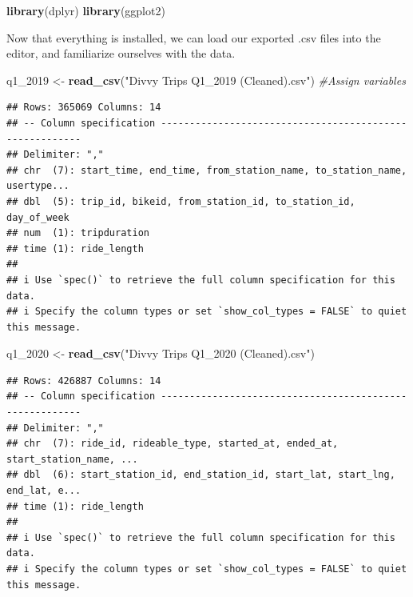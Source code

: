 \documentclass[
]{article}
\newenvironment{Shaded}{\begin{snugshade}}{\end{snugshade}}
\newcommand{\CommentTok}[1]{\textcolor[rgb]{0.56,0.35,0.01}{\textit{#1}}}
\newcommand{\FunctionTok}[1]{\textcolor[rgb]{0.13,0.29,0.53}{\textbf{#1}}}
\newcommand{\NormalTok}[1]{#1}
\newcommand{\OtherTok}[1]{\textcolor[rgb]{0.56,0.35,0.01}{#1}}
\newcommand{\StringTok}[1]{\textcolor[rgb]{0.31,0.60,0.02}{#1}}
\begin{document}
\begin{Shaded}
\begin{Highlighting}[]
\FunctionTok{library}\NormalTok{(dplyr)}
\FunctionTok{library}\NormalTok{(ggplot2)}
\end{Highlighting}
\end{Shaded}

Now that everything is installed, we can load our exported .csv files
into the editor, and familiarize ourselves with the data.

\begin{Shaded}
\begin{Highlighting}[]
\NormalTok{q1\_2019 }\OtherTok{\textless{}{-}} \FunctionTok{read\_csv}\NormalTok{(}\StringTok{"Divvy Trips Q1\_2019 (Cleaned).csv"}\NormalTok{) }\CommentTok{\#Assign variables}
\end{Highlighting}
\end{Shaded}

\begin{verbatim}
## Rows: 365069 Columns: 14
## -- Column specification --------------------------------------------------------
## Delimiter: ","
## chr  (7): start_time, end_time, from_station_name, to_station_name, usertype...
## dbl  (5): trip_id, bikeid, from_station_id, to_station_id, day_of_week
## num  (1): tripduration
## time (1): ride_length
## 
## i Use `spec()` to retrieve the full column specification for this data.
## i Specify the column types or set `show_col_types = FALSE` to quiet this message.
\end{verbatim}

\begin{Shaded}
\begin{Highlighting}[]
\NormalTok{q1\_2020 }\OtherTok{\textless{}{-}} \FunctionTok{read\_csv}\NormalTok{(}\StringTok{"Divvy Trips Q1\_2020 (Cleaned).csv"}\NormalTok{)}
\end{Highlighting}
\end{Shaded}

\begin{verbatim}
## Rows: 426887 Columns: 14
## -- Column specification --------------------------------------------------------
## Delimiter: ","
## chr  (7): ride_id, rideable_type, started_at, ended_at, start_station_name, ...
## dbl  (6): start_station_id, end_station_id, start_lat, start_lng, end_lat, e...
## time (1): ride_length
## 
## i Use `spec()` to retrieve the full column specification for this data.
## i Specify the column types or set `show_col_types = FALSE` to quiet this message.
\end{verbatim}
\end{document}
